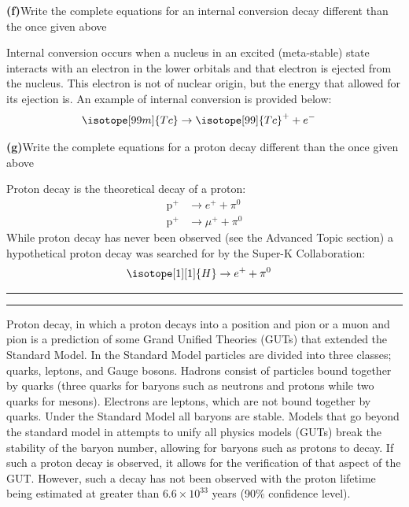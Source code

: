 \documentclass[11pt]{article}
\newcommand{\question}[2] {\vspace{.25in} \hrule\vspace{0.5em}
\noindent{\bf #1: #2} \vspace{0.5em}
\hrule \vspace{.10in}}
\renewcommand{\part}[1] {\vspace{.10in} {\bf (#1)}}
\begin{document}
\part{f}{Write the complete equations for an internal conversion decay different than the once given above}

Internal conversion occurs when a nucleus in an excited (meta-stable) state interacts with an electron in the lower orbitals and that electron is ejected from the nucleus. This electron is not of nuclear origin, but the energy that allowed for its ejection is. An example of internal conversion is provided below:
\begin{align}
    \isotope[99m]{Tc} &\to \isotope[99]{Tc}^{+} + e^{-}
\end{align}


\part{g}{Write the complete equations for a proton decay different than the once given above}

Proton decay is the theoretical decay of a proton:
\begin{align*}
    \text{p}^{+} &\to e^{+} + \pi^{0} \\
    \text{p}^{+} &\to \mu^{+} + \pi^{0}
\end{align*}
While proton decay has never been observed (see the Advanced Topic section) a hypothetical proton decay was searched for by the Super-K Collaboration:
\begin{align}
    \isotope[1][1]{H} &\to e^{+} +\pi^{0}
\end{align}

\question{Advanced Topic}{Proton Decay}
Proton decay, in which a proton decays into a position and pion or a muon and pion is a prediction of some Grand Unified Theories (GUTs) that extended the Standard Model.
In the Standard Model particles are divided into three classes; quarks, leptons, and Gauge bosons.
Hadrons consist of particles bound together by quarks (three quarks for baryons such as neutrons and protons while two quarks for mesons).
Electrons are leptons, which are not bound together by quarks.
Under the Standard Model all baryons are stable.
Models that go beyond the standard model in attempts to unify all physics models (GUTs) break the stability of the baryon number, allowing for baryons such as protons to decay.
If such a proton decay is observed, it allows for the verification of that aspect of the GUT.
However, such a decay has not been observed with the proton lifetime being estimated at greater than $6.6\times10^{33}$ years (90\% confidence level).
\end{document}
